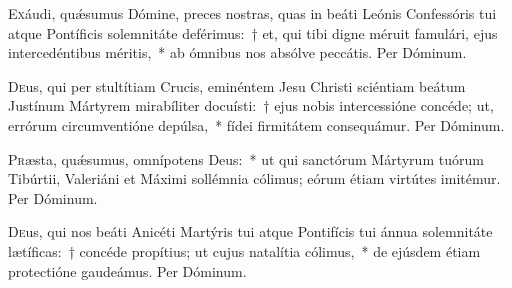 \documentclass[vesperale_romanum.tex]{subfiles}
\begin{document}
\quadcommferiae


\myrule


\duplex

\oratio

\lettrine{E}{x}áudi, quǽsumus Dómine, preces nostras, quas in beáti Leónis Confessóris tui atque Pontíficis sole\-mnitáte deférimus:~† et, qui tibi digne méruit famulári, ejus intercedéntibus méritis,~* ab ómnibus nos absólve peccátis. Per Dóminum.

 \quadcommferiae

\myrule


\duplex

\oratio


\lettrine{D}{e}us, qui per stultítiam Crucis, eminéntem Jesu Christi sciéntiam beátum Justínum Mártyrem mirabíliter docuísti:~† ejus nobis intercessióne concéde; ut, errórum circumventióne depúlsa,~* fídei firmitátem consequámur. Per Dóminum.




\oratio

\lettrine{P}{r}æsta, quǽsumus, omnípotens Deus:~* ut qui san\-ctórum Mártyrum tuórum Tibúrtii, Valeriáni et Máximi sollémnia cólimus; eórum étiam virtútes imitémur.
Per Dóminum.
 
\myrule


\oratio

\lettrine{D}{e}us, qui nos beáti Anicéti Martýris tui atque Pontifícis tui ánnua sole\-mnitáte lætíficas:~† concéde propítius; ut cujus natalítia cólimus,~* de ejúsdem étiam prote\-ctióne gaudeámus. Per Dóminum.
\end{document}
